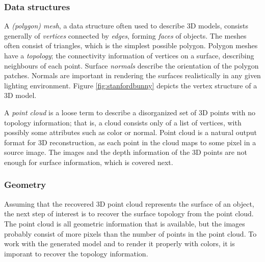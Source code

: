 
\subsubsection{Data structures} %



A \emph{(polygon) mesh}, a data structure often used to describe 3D models, consists generally of \emph{vertices} connected by \emph{edges}, forming \emph{faces} of objects.
The meshes often consist of triangles, which is the simplest possible polygon.
Polygon meshes have a \emph{topology}; the connectivity information of vertices on a surface, describing neighbours of each point.
Surface \emph{normals} describe the orientation of the polygon patches.
Normals are important in rendering the surfaces realistically in any given lighting environment.
Figure \ref{fig:stanfordbunny} depicts the vertex structure of a 3D model.

A \emph{point cloud} is a loose term to describe a disorganized set of 3D points with no topology information; that is, a cloud consists only of a list of vertices, with possibly some attributes such as color or normal.
Point cloud is a natural output format for 3D reconstruction, as each point in the cloud maps to some pixel in a source image.
The images and the depth information of the 3D points are not enough for surface information, which is covered next.


\subsubsection{Geometry} %

Assuming that the recovered 3D point cloud represents the surface of an object, the next step of interest is to recover the surface topology from the point cloud.
The point cloud is all geometric information that is available, but the images probably consist of more pixels than the number of points in the point cloud.
To work with the generated model and to render it properly with colors, it is imporant to recover the topology information.

